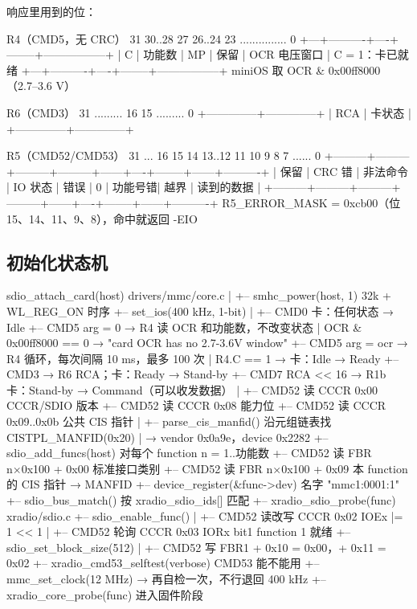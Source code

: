 响应里用到的位：

\begin{txtcode}
R4（CMD5，无 CRC）
 31   30..28      27   26..24   23 ............... 0
+---+----------+----+--------+-----------------+
| C | 功能数    | MP | 保留    | OCR 电压窗口     |   C = 1：卡已就绪
+---+----------+----+--------+-----------------+   miniOS 取 OCR & 0x00ff8000（2.7–3.6 V）

R6（CMD3）
 31 ......... 16   15 ......... 0
+--------------+--------------+
| RCA          | 卡状态        |
+--------------+--------------+

R5（CMD52/CMD53）
 31 ... 16   15        14        13..12    11     10   9        8      7 ...... 0
+---------+---------+---------+---------+------+----+--------+------+----------+
| 保留     | CRC 错  | 非法命令 | IO 状态  | 错误 | 0  | 功能号错| 越界  | 读到的数据 |
+---------+---------+---------+---------+------+----+--------+------+----------+
R5_ERROR_MASK = 0xcb00（位 15、14、11、9、8），命中就返回 -EIO
\end{txtcode}

\subsection{初始化状态机}

\begin{txtcode}
sdio_attach_card(host)                            drivers/mmc/core.c
|
+-- smhc_power(host, 1)                           32k + WL_REG_ON 时序
+-- set_ios(400 kHz, 1-bit)
|
+-- CMD0                        卡：任何状态 → Idle
+-- CMD5  arg = 0       → R4    读 OCR 和功能数，不改变状态
|     OCR & 0x00ff8000 == 0 → "card OCR has no 2.7-3.6V window"
+-- CMD5  arg = ocr     → R4    循环，每次间隔 10 ms，最多 100 次
|     R4.C == 1  →  卡：Idle → Ready
+-- CMD3                → R6    RCA；卡：Ready → Stand-by
+-- CMD7  RCA << 16     → R1b   卡：Stand-by → Command（可以收发数据）
|
+-- CMD52 读 CCCR 0x00          CCCR/SDIO 版本
+-- CMD52 读 CCCR 0x08          能力位
+-- CMD52 读 CCCR 0x09..0x0b    公共 CIS 指针
|     +-- parse_cis_manfid()    沿元组链表找 CISTPL_MANFID(0x20)
|                               → vendor 0x0a9e，device 0x2282
+-- sdio_add_funcs(host)        对每个 function n = 1..功能数
      +-- CMD52 读 FBR n×0x100 + 0x00     标准接口类别
      +-- CMD52 读 FBR n×0x100 + 0x09     本 function 的 CIS 指针 → MANFID
      +-- device_register(&func->dev)     名字 "mmc1:0001:1"
            +-- sdio_bus_match()          按 xradio_sdio_ids[] 匹配
                  +-- xradio_sdio_probe(func)            xradio/sdio.c
                        +-- sdio_enable_func()
                        |   +-- CMD52 读改写 CCCR 0x02 IOEx |= 1 << 1
                        |   +-- CMD52 轮询 CCCR 0x03 IORx bit1   function 1 就绪
                        +-- sdio_set_block_size(512)
                        |   +-- CMD52 写 FBR1 + 0x10 = 0x00，+ 0x11 = 0x02
                        +-- xradio_cmd53_selftest(verbose)      CMD53 能不能用
                        +-- mmc_set_clock(12 MHz) → 再自检一次，不行退回 400 kHz
                        +-- xradio_core_probe(func)            进入固件阶段
\end{txtcode}


